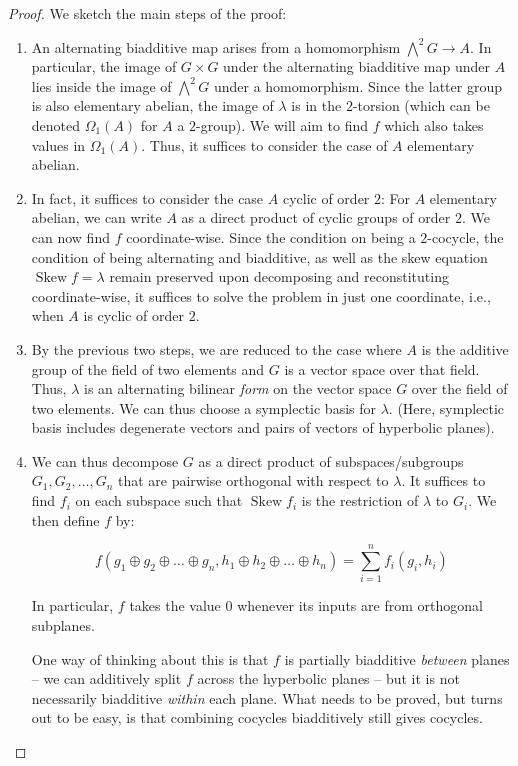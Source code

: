 \documentclass[10pt]{amsart}
\newcommand{\Skew}{\operatorname{Skew}}
\begin{document}
\begin{proof}
  We sketch the main steps of the proof:

  \begin{enumerate}
  \item An alternating biadditive map arises from a homomorphism
    $\bigwedge^2G \to A$. In particular, the image of $G \times G$
    under the alternating biadditive map under $A$ lies inside the
    image of $\bigwedge^2G$ under a homomorphism. Since the latter
    group is also elementary abelian, the image of $\lambda$ is in the
    $2$-torsion (which can be denoted $\Omega_1(A)$ for $A$ a
    $2$-group). We will aim to find $f$ which also takes values in
    $\Omega_1(A)$. Thus, it suffices to consider the case of $A$
    elementary abelian.
  \item In fact, it suffices to consider the case $A$ cyclic of order
    $2$: For $A$ elementary abelian, we can write $A$ as a direct
    product of cyclic groups of order $2$. We can now find $f$
    coordinate-wise. Since the condition on being a $2$-cocycle, the
    condition of being alternating and biadditive, as well as the skew
    equation $\Skew f = \lambda$ remain preserved upon decomposing and
    reconstituting coordinate-wise, it suffices to solve the problem
    in just one coordinate, i.e., when $A$ is cyclic of order $2$.
  \item By the previous two steps, we are reduced to the case where
    $A$ is the additive group of the field of two elements and $G$ is
    a vector space over that field. Thus, $\lambda$ is an alternating
    bilinear {\em form} on the vector space $G$ over the field of two
    elements. We can thus choose a symplectic basis for
    $\lambda$. (Here, symplectic basis includes degenerate vectors and
    pairs of vectors of hyperbolic planes).
  \item We can thus decompose $G$ as a direct product of
    subspaces/subgroups $G_1, G_2, \dots, G_n$ that are pairwise
    orthogonal with respect to $\lambda$. It suffices to find $f_i$ on
    each subspace such that $\Skew f_i$ is the restriction of
    $\lambda$ to $G_i$. We then define $f$ by:

    $$f(g_1 \oplus g_2 \oplus \dots \oplus g_n, h_1 \oplus h_2 \oplus \dots \oplus h_n) = \sum_{i=1}^n f_i(g_i,h_i)$$

    In particular, $f$ takes the value $0$ whenever its inputs are
    from orthogonal subplanes.

    One way of thinking about this is that $f$ is partially biadditive
    {\em between} planes -- we can additively split $f$ across the
    hyperbolic planes -- but it is not necessarily biadditive {\em
    within} each plane. What needs to be proved, but turns out to be
    easy, is that combining cocycles biadditively still gives
    cocycles.


\end{enumerate}
\end{proof}
\end{document}
